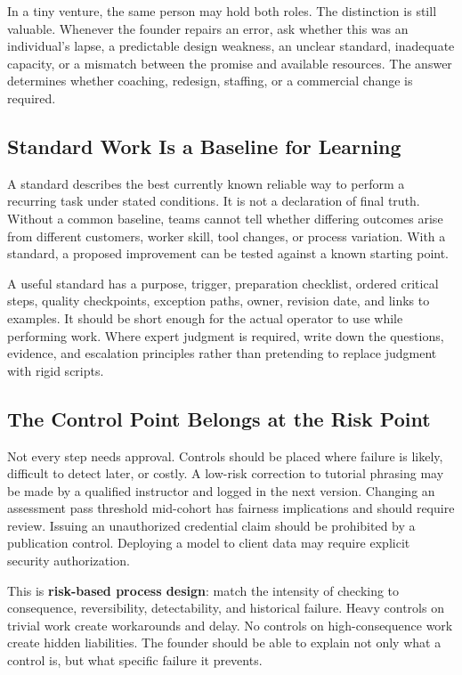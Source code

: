 In a tiny venture, the same person may hold both roles. The distinction is still valuable. Whenever the founder repairs an error, ask whether this was an individual's lapse, a predictable design weakness, an unclear standard, inadequate capacity, or a mismatch between the promise and available resources. The answer determines whether coaching, redesign, staffing, or a commercial change is required.

\subsection{Standard Work Is a Baseline for Learning}
\label{sec:standard_work}

A standard describes the best currently known reliable way to perform a recurring task under stated conditions. It is not a declaration of final truth. Without a common baseline, teams cannot tell whether differing outcomes arise from different customers, worker skill, tool changes, or process variation. With a standard, a proposed improvement can be tested against a known starting point.

A useful standard has a purpose, trigger, preparation checklist, ordered critical steps, quality checkpoints, exception paths, owner, revision date, and links to examples. It should be short enough for the actual operator to use while performing work. Where expert judgment is required, write down the questions, evidence, and escalation principles rather than pretending to replace judgment with rigid scripts.

\subsection{The Control Point Belongs at the Risk Point}
\label{sec:control_at_risk_point}

Not every step needs approval. Controls should be placed where failure is likely, difficult to detect later, or costly. A low-risk correction to tutorial phrasing may be made by a qualified instructor and logged in the next version. Changing an assessment pass threshold mid-cohort has fairness implications and should require review. Issuing an unauthorized credential claim should be prohibited by a publication control. Deploying a model to client data may require explicit security authorization.

This is \textbf{risk-based process design}: match the intensity of checking to consequence, reversibility, detectability, and historical failure. Heavy controls on trivial work create workarounds and delay. No controls on high-consequence work create hidden liabilities. The founder should be able to explain not only what a control is, but what specific failure it prevents.

